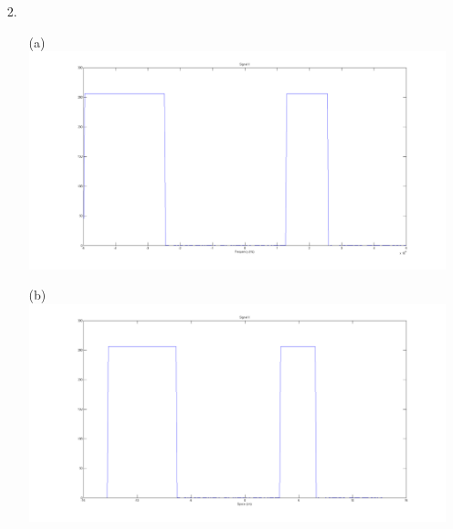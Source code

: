 \documentclass{article}
\begin{document}
\begin{enumerate}
\newpage

\item[2.]
	\begin{enumerate}
	\item[(a)] $\;$\\
\includegraphics[width=\textwidth]{../images/SignalX} \\
	\item[(b)] $\;$\\
\includegraphics[width=\textwidth]{../images/SpaceX} \\

\newpage


\end{enumerate}
\end{enumerate}
\end{document}
